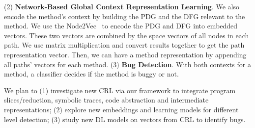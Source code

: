 (2) \textbf{Network-Based Global Context Representation Learning}.  We
also encode the method's context by building the PDG and the DFG
relevant to the method.
We use the Node2Vec~\cite{Grover-2016} to encode the PDG and DFG into
embedded vectors. These two vectors are combined by the space vectors
of all nodes in each path. We use matrix multiplication and convert
results together to get the path representation vector. Then, we can
have a method representation by appending all paths' vectors for each
method.  (3) \textbf{Bug Detection}. With both contexts for a method,
a classifier decides if the method is buggy or not. 

We plan to (1) investigate new CRL via our
framework to integrate program slices/reduction, symbolic traces, code
abstraction and intermediate representations; (2) explore new
embeddings and learning models for different level detection; (3) study new DL models on vectors from CRL to identify bugs.



